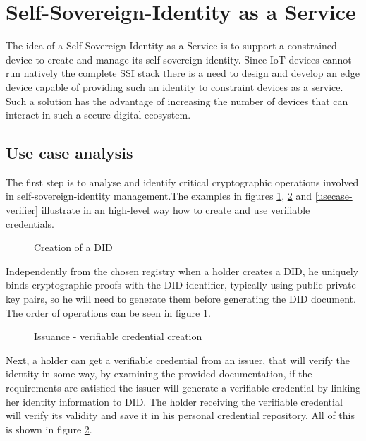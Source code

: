 
\section{Self-Sovereign-Identity as a Service}
The idea of a Self-Sovereign-Identity as a Service is to support a constrained device to create and manage its self-sovereign-identity. Since IoT devices cannot run natively the complete SSI stack there is a need to design and develop an edge device capable of providing such an identity to constraint devices as a service.  Such a solution has the advantage of increasing the number of devices that can interact in such a secure digital ecosystem.

\subsection{Use case analysis}
The first step is to analyse and identify critical cryptographic operations involved in self-sovereign-identity management.The examples in figures \ref{usecase-did}, \ref{usecase-issuer} and \ref{usecase-verifier} illustrate in an high-level way how to create and use verifiable credentials. 
\begin{figure}[!h]
    \centering
    
    \caption{Creation of a DID}
    \label{usecase-did}
\end{figure}

Independently from the chosen registry when a holder creates a DID, he uniquely binds cryptographic proofs with the DID identifier, typically using public-private key pairs, so he will need to generate them before generating the DID document. The order of operations can be seen in figure \ref{usecase-did}. 

\begin{figure}[!h]
    \centering
    
    \caption{Issuance - verifiable credential creation}
    \label{usecase-issuer}
\end{figure}
Next, a holder can get a verifiable credential from an issuer, that will verify the identity in some way, by examining the provided documentation, if the requirements are satisfied the issuer will generate a verifiable credential by linking her identity information to DID. The holder receiving the verifiable credential will verify its validity and save it in his personal credential repository. All of this is shown in figure \ref{usecase-issuer}. 


